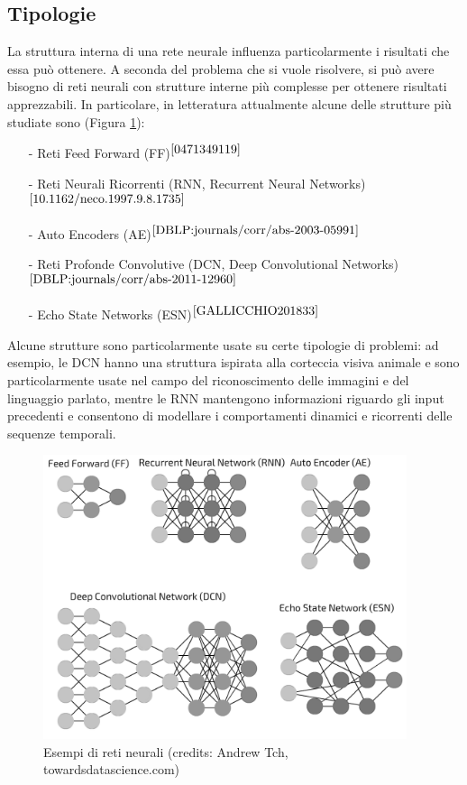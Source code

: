\subsection*{Tipologie} La struttura interna di una rete neurale influenza particolarmente i risultati che essa può ottenere. A seconda del problema che si vuole risolvere, si può avere bisogno di reti neurali con strutture interne più complesse per ottenere risultati apprezzabili. In particolare, in letteratura attualmente alcune delle strutture più studiate sono (Figura \ref{fig:tipologiereti}):
\begin{itemize}
    \item[-] Reti Feed Forward (FF)$^{\cite{0471349119}}$
    \item[-] Reti Neurali Ricorrenti (RNN, Recurrent Neural Networks)$^{\cite{10.1162/neco.1997.9.8.1735}}$
    \item[-] Auto Encoders (AE)$^{\cite{DBLP:journals/corr/abs-2003-05991}}$
    \item[-] Reti Profonde Convolutive (DCN, Deep Convolutional Networks)$^{\cite{DBLP:journals/corr/abs-2011-12960}}$
    \item[-] Echo State Networks (ESN)$^{\cite{GALLICCHIO201833}}$
\end{itemize}
Alcune strutture sono particolarmente usate su certe tipologie di problemi: ad esempio, le DCN hanno una struttura ispirata alla corteccia visiva animale e sono particolarmente usate nel campo del riconoscimento delle immagini e del linguaggio parlato, mentre le RNN mantengono informazioni riguardo gli input precedenti e consentono di modellare i comportamenti dinamici e ricorrenti delle sequenze temporali.
\begin{figure}[b]
	\begin{center}
		\includegraphics[width=0.95\textwidth]{img/tipologiereti.png}
		\caption{Esempi di reti neurali (credits: Andrew Tch, towardsdatascience.com)}
		\label{fig:tipologiereti}
	\end{center}
\end{figure}

